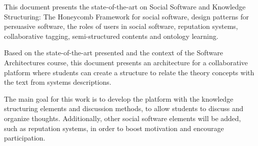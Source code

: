 \documentclass{llncs}
\begin{document}
This document presents the state-of-the-art on Social Software and Knowledge Structuring: The Honeycomb Framework for social software, design patterns for persuasive software, the roles of users in social software, reputation systems, collaborative tagging, semi-structured contents and ontology learning.

Based on the state-of-the-art presented and the context of the Software Architectures course, this document presents an architecture for a collaborative platform where students can create a structure to relate the theory concepts with the text from systems descriptions.

The main goal for this work is to develop the platform with the knowledge structuring elements and discussion methods, to allow students to discuss and organize thoughts. Additionally, other social software elements will be added, such as reputation systems, in order to boost motivation and encourage participation. 

%
%


\end{document}
